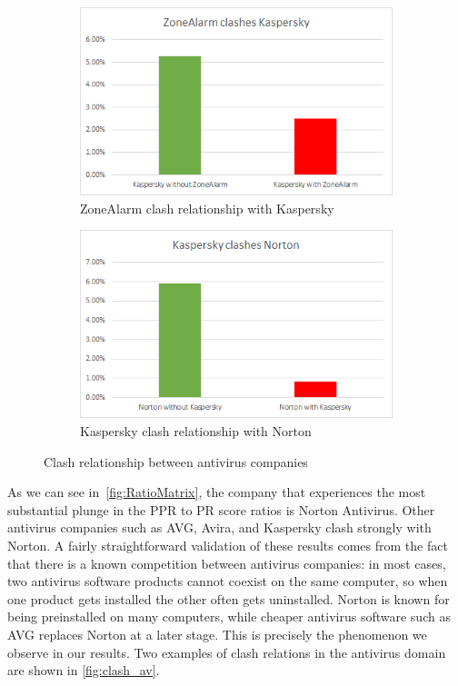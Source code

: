\documentclass[ijoc,nonblindrev]{informs3} %
\numberwithin{equation}{subsection}
\begin{document}
\begin{figure}[!htbp]
\centering
\begin{subfigure}[b]{0.49\textwidth}
	\centering
\includegraphics[scale=0.49]{figures/zone_clash_kaspersky.png}
\caption{ZoneAlarm clash relationship with Kaspersky}
\label{fig:zone_clash_kaspersky}
\end{subfigure}
\begin{subfigure}[b]{0.49\textwidth}
	\centering
\includegraphics[scale=0.49]{figures/kaspersky_clash_norton.png}
\caption{Kaspersky clash relationship with Norton}
\label{fig:kaspersky_clash_norton}
\end{subfigure}
\caption{Clash relationship between antivirus companies}
	\label{fig:clash_av}
\end{figure}

As we can see in~\autoref{fig:RatioMatrix}, the company that experiences the most substantial plunge in the PPR to PR score ratios is Norton Antivirus. Other antivirus companies such as AVG, Avira, and Kaspersky clash strongly with Norton. A fairly straightforward validation of these results comes from the fact that there is a known competition between antivirus companies: in most cases, two antivirus software products cannot coexist on the same computer, so when one product gets installed the other often gets uninstalled. Norton is known for being preinstalled on many computers, while cheaper antivirus software such as AVG replaces Norton at a later stage. This is precisely the phenomenon we observe in our results. Two examples of clash relations in the antivirus domain are shown in \autoref{fig:clash_av}.
\end{document}
